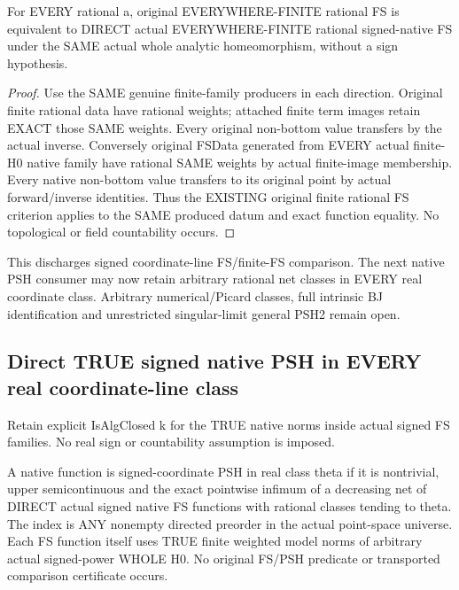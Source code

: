 \begin{theorem}
\label{thm:seven-native-original-finite-signed-fs-class-comparison}
\leanok
For EVERY rational a, original EVERYWHERE-FINITE rational FS is equivalent
to DIRECT actual EVERYWHERE-FINITE rational signed-native FS under the
SAME actual whole analytic homeomorphism, without a sign hypothesis.
\end{theorem}
\begin{proof}
Use the SAME genuine finite-family producers in each direction. Original
finite rational data have rational weights; attached finite term images
retain EXACT those SAME weights. Every original non-bottom value
transfers by the actual inverse. Conversely original FSData generated
from EVERY actual finite-H0 native family have rational SAME weights
by actual finite-image membership. Every native non-bottom value
transfers to its original point by actual forward/inverse identities.
Thus the EXISTING original finite rational FS criterion applies to the
SAME produced datum and exact function equality. No topological or field
countability occurs.
\end{proof}

This discharges signed coordinate-line FS/finite-FS comparison. The next
native PSH consumer may now retain arbitrary rational net classes in EVERY
real coordinate class. Arbitrary numerical/Picard classes, full intrinsic
BJ identification and unrestricted singular-limit general PSH2 remain open.

\subsection{Direct TRUE signed native PSH in EVERY real coordinate-line class}
Retain explicit IsAlgClosed k for the TRUE native norms inside actual
signed FS families. No real sign or countability assumption is imposed.

\begin{definition}
\label{def:seven-direct-native-signed-psh}
\leanok
A native function is signed-coordinate PSH in real class theta if it is
nontrivial, upper semicontinuous and the exact pointwise infimum of a
decreasing net of DIRECT actual signed native FS functions with rational
classes tending to theta. The index is ANY nonempty directed preorder
in the actual point-space universe. Each FS function itself uses TRUE
finite weighted model norms of arbitrary actual signed-power WHOLE H0.
No original FS/PSH predicate or transported comparison certificate occurs.
\end{definition}

